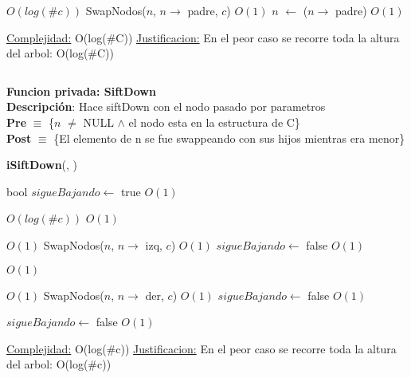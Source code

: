 \begin{Algoritmos}
\begin{algorithm}[H]
\begin{algorithmic}[1]
     \Comment $O(log(\#c))$
        \State SwapNodos($n$, $n \to$ padre, $c$) \Comment $O(1)$
        \State $n$ $\gets$ ($n \to$ padre) \Comment $O(1)$
    \EndWhile

    \medskip
    \Statex \underline{Complejidad:} O(log($\#$C))
    \Statex \underline{Justificacion:} En el peor caso se recorre toda la altura del arbol: O(log($\#$C))
\end{algorithmic}
\end{algorithm}



$ $\newline

\textbf{Funcion privada: SiftDown}\\
\textbf{Descripci\'on}: Hace siftDown con el nodo pasado por parametros\\
\textbf{Pre} $\equiv$ \{$n$ $\neq$ NULL $\land$ el nodo esta en la estructura de C\}\\%
\textbf{Post} $\equiv$ \{El elemento de n se fue swappeando con sus hijos mientras era menor\}%
\begin{algorithm}[H]
{\textbf{iSiftDown}(, )}
\begin{algorithmic}[1]

    \State bool $sigueBajando \gets$ true \Comment $O(1)$

      \Comment $O(log(\#c))$
         \Comment $O(1)$ 

             \Comment $O(1)$
                \State SwapNodos($n$, $n \to$ izq, $c$) \Comment $O(1)$
            \Else
                \State $sigueBajando \gets$ false \Comment $O(1)$
            \EndIf

        \Else
             \Comment $O(1)$
            
                 \Comment $O(1)$
                    \State SwapNodos($n$, $n \to$ der, $c$) \Comment $O(1)$
                \Else
                    \State $sigueBajando \gets$ false \Comment $O(1)$
                \EndIf
            
            \Else
                \State $sigueBajando \gets$ false \Comment $O(1)$
            \EndIf
        \EndIf


    \EndWhile 

    \medskip
    \Statex \underline{Complejidad:} O(log($\#$c))
    \Statex \underline{Justificacion:} En el peor caso se recorre toda la altura del arbol: O(log($\#$c))
\end{algorithmic}
\end{algorithm}




\end{Algoritmos}
